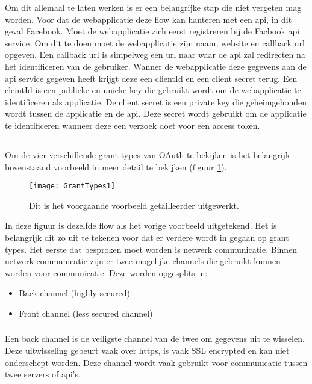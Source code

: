 Om dit allemaal te laten werken is er een belangrijke stap die niet vergeten mag worden. Voor dat de webapplicatie deze flow kan hanteren met een api, in dit geval Facebook. Moet de webapplicatie zich eerst registreren bij de Facbook api service. Om dit te doen moet de webapplicatie zijn naam, website en callback url opgeven. Een callback url is simpelweg een url naar waar de api zal redirecten na het identificeren van de gebruiker. Wanner de webapplicatie deze gegevens aan de api service gegeven heeft krijgt deze een clientId en een client secret terug. Een cleintId is een publieke en unieke key die gebruikt wordt om de webapplicatie te identificeren als applicatie. De client secret is een private key die geheimgehouden wordt tussen de applicatie en de api. Deze secret wordt gebruikt om de applicatie te identificeren wanneer deze een verzoek doet voor een access token. 

\subsection{}
Om de vier verschillende grant types van OAuth te bekijken is het belangrijk bovenstaand voorbeeld in meer detail te bekijken (figuur \ref{fig:grantTypes1}).
\begin{figure}[H]
	\centering
	\texttt{[image: GrantTypes1]} 
	\caption[Gedetailleerd voorbeeld voor uitleg grant types]{Dit is het voorgaande voorbeeld getailleerder uitgewerkt.}
	\label{fig:grantTypes1}
\end{figure}
In deze figuur is dezelfde flow als het vorige voorbeeld uitgetekend. Het is belangrijk dit zo uit te tekenen voor dat er verdere wordt in gegaan op grant types.
Het eerste dat besproken moet worden is netwerk communicatie. Binnen netwerk communicatie zijn er twee mogelijke channels die gebruikt kunnen worden voor communicatie. Deze worden opgesplits in: 
\begin{itemize}
	\item Back channel (highly secured)
	\item Front channel (less secured channel)
\end{itemize}
\subsubsection{}
Een back channel is de veiligste channel van de twee om gegevens uit te wisselen. Deze uitwisseling gebeurt vaak over https, is vaak SSL encrypted en kan niet onderschept worden. Deze channel wordt vaak gebruikt voor communicatie tussen twee servers of api's.
